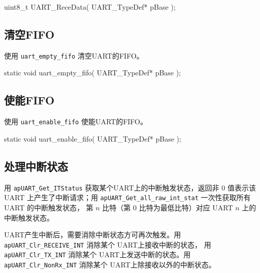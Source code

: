 \documentclass[
  12pt,
]{book}
\newenvironment{Shaded}{\begin{snugshade}}{\end{snugshade}}
\newcommand{\DataTypeTok}[1]{\textcolor[rgb]{0.13,0.29,0.53}{#1}}
\newcommand{\NormalTok}[1]{#1}
\begin{document}
\begin{Shaded}
\begin{Highlighting}[]
\DataTypeTok{uint8_t}\NormalTok{ UART_ReceData(}
\NormalTok{  UART_TypeDef* pBase}
\NormalTok{  );}
\end{Highlighting}
\end{Shaded}

\hypertarget{ux6e05ux7a7afifo}{%
\subsection{清空FIFO}\label{ux6e05ux7a7afifo}}

使用 \texttt{uart\_empty\_fifo} 清空UART的FIFO。

\begin{Shaded}
\begin{Highlighting}[]
\DataTypeTok{static} \DataTypeTok{void}\NormalTok{ uart_empty_fifo(}
\NormalTok{  UART_TypeDef* pBase}
\NormalTok{  );}
\end{Highlighting}
\end{Shaded}

\hypertarget{ux4f7fux80fdfifo}{%
\subsection{使能FIFO}\label{ux4f7fux80fdfifo}}

使用 \texttt{uart\_enable\_fifo} 使能UART的FIFO。

\begin{Shaded}
\begin{Highlighting}[]
\DataTypeTok{static} \DataTypeTok{void}\NormalTok{ uart_enable_fifo(}
\NormalTok{  UART_TypeDef* pBase}
\NormalTok{  );}
\end{Highlighting}
\end{Shaded}

\hypertarget{ux5904ux7406ux4e2dux65adux72b6ux6001-3}{%
\subsection{处理中断状态}\label{ux5904ux7406ux4e2dux65adux72b6ux6001-3}}

用 \texttt{apUART\_Get\_ITStatus} 获取某个UART上的中断触发状态，返回非 0 值表示该 UART
上产生了中断请求；用 \texttt{apUART\_Get\_all\_raw\_int\_stat} 一次性获取所有 UART 的中断触发状态，
第 \(n\) 比特（第 0 比特为最低比特）对应 UART \(n\) 上的中断触发状态。

UART产生中断后，需要消除中断状态方可再次触发。用 \texttt{apUART\_Clr\_RECEIVE\_INT} 消除某个 UART上接收中断的状态，
用 \texttt{apUART\_Clr\_TX\_INT} 消除某个 UART上发送中断的状态。用 \texttt{apUART\_Clr\_NonRx\_INT} 消除某个 UART上除接收以外的中断状态。
\end{document}
